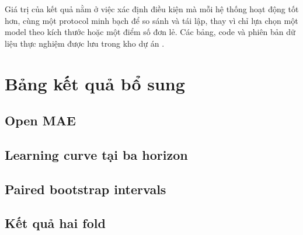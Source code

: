 \documentclass[11pt,a4paper]{article}
\begin{document}
Giá trị của kết quả nằm ở việc xác định điều kiện mà mỗi hệ thống hoạt
động tốt hơn, cùng một protocol minh bạch để so sánh và tái lập, thay
vì chỉ lựa chọn một model theo kích thước hoặc một điểm số đơn lẻ.
Các bảng, code và phiên bản dữ liệu thực nghiệm được lưu trong kho
dự án \citep{vn30repository}.

\begingroup
\small
\setlength{\bibsep}{3pt}


\endgroup
\clearpage
\appendix
\section{Bảng kết quả bổ sung}
\subsection{Open MAE}\label{app:open}
\begin{table}[htbp]
\centering\small
\caption{Open MAE trên test, mean $\pm$ SD ba seed; quy ước như Bảng~\ref{tab:close}.}

\end{table}

\subsection{Learning curve tại ba horizon}\label{app:learning}
\begin{table}[htbp]
\centering\small
\caption{Close MAE theo data budget và initialization, mean ba seed.
Full budget là 1.589 session.}

\end{table}
\FloatBarrier
\clearpage

\subsection{Paired bootstrap intervals}\label{app:ci}
\begin{table}[htbp]
\centering\small
\caption{Chênh lệch Close MAE với Naive và CI 95\%, seed 42, $n=323$.
Block 20 origins, 2.000 lần lấy mẫu.}

\end{table}
\FloatBarrier

\subsection{Kết quả hai fold}\label{app:fold}
\begin{table}[htbp]
\centering\small
\caption{Close MAE trên hai fold, neural seed 42, 208 origins/fold.
SFT dùng best-trained; mỗi fold có train/validation riêng.}

\end{table}
\FloatBarrier
\end{document}
